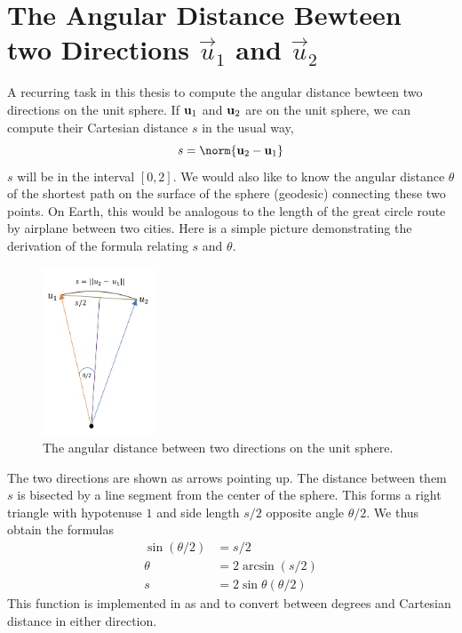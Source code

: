\section{The Angular Distance Bewteen two Directions $\vec{u}_1$ and $\vec{u}_2$}
\label{section_ztf_angle_diff}
A recurring task in this thesis to compute the angular distance bewteen two directions on the unit sphere.
If $\mathbf{u}_1$ and $\mathbf{u}_2$ are on the unit sphere, we can compute their Cartesian distance $s$ in the usual way,
$$ s = \norm{\uvec_2 - \uvec_1}$$
$s$ will be in the interval $[0, 2]$.
We would also like to know the angular distance $\theta$ of the shortest path 
on the surface of the sphere (geodesic) connecting these two points.
On Earth, this would be analogous to the length of the great circle route by airplane between two cities.
Here is a simple picture demonstrating the derivation of the formula relating $s$ and $\theta$.
\begin{figure}[hbt!]
\begin{center}
\includegraphics[width=0.3\textwidth]{../figs/misc/angular_distance.png}
\caption{The angular distance between two directions on the unit sphere.}
\end{center}
\end{figure}
The two directions are shown as arrows pointing up.
The distance between them $s$ is bisected by a line segment from the center of the sphere.
This forms a right triangle with hypotenuse $1$ and side length $s/2$ opposite angle $\theta/2$.
We thus obtain the formulas
\begin{align*}
\sin (\theta / 2) &= s / 2 \\ 
\theta &= 2 \arcsin (s / 2) \\
s &= 2 \sin \theta (\theta / 2)
\end{align*}
This function is implemented in  as  and  to convert between degrees and Cartesian distance in either direction.


